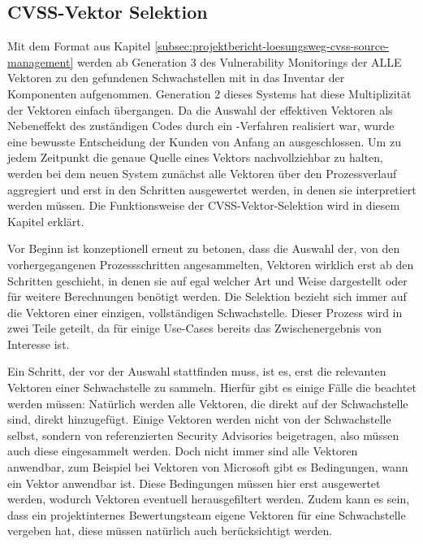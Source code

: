 \subsection{CVSS-Vektor Selektion} \label{subsec:projektbericht-loesungsweg-cvss-selection}

Mit dem Format aus Kapitel \ref{subsec:projektbericht-loesungsweg-cvss-source-management} werden ab Generation 3 des Vulnerability Monitorings der {\metaeffekt} ALLE Vektoren zu den gefundenen Schwachstellen mit in das Inventar der Komponenten aufgenommen.
Generation 2 dieses Systems hat diese Multiplizität der Vektoren einfach übergangen.
Da die Auswahl der effektiven Vektoren als Nebeneffekt des zuständigen Codes durch ein -Verfahren realisiert war, wurde eine bewusste Entscheidung der Kunden von Anfang an ausgeschlossen.
Um zu jedem Zeitpunkt die genaue Quelle eines Vektors nachvollziehbar zu halten, werden bei dem neuen System zunächst alle Vektoren über den Prozessverlauf aggregiert und erst in den Schritten ausgewertet werden, in denen sie interpretiert werden müssen.
Die Funktionsweise der CVSS-Vektor-Selektion wird in diesem Kapitel erklärt.

Vor Beginn ist konzeptionell erneut zu betonen, dass die Auswahl der, von den vorhergegangenen Prozessschritten angesammelten, Vektoren wirklich erst ab den Schritten geschieht, in denen sie auf egal welcher Art und Weise dargestellt oder für weitere Berechnungen benötigt werden.
Die Selektion bezieht sich immer auf die Vektoren einer einzigen, vollständigen Schwachstelle.
Dieser Prozess wird in zwei Teile geteilt, da für einige Use-Cases bereits das Zwischenergebnis von Interesse ist.

Ein Schritt, der vor der Auswahl stattfinden muss, ist es, erst die relevanten Vektoren einer Schwachstelle zu sammeln.
Hierfür gibt es einige Fälle die beachtet werden müssen:
Natürlich werden alle Vektoren, die direkt auf der Schwachstelle sind, direkt hinzugefügt.
Einige Vektoren werden nicht von der Schwachstelle selbst, sondern von referenzierten Security Advisories beigetragen, also müssen auch diese eingesammelt werden.
Doch nicht immer sind alle Vektoren anwendbar, zum Beispiel bei Vektoren von Microsoft gibt es Bedingungen, wann ein Vektor anwendbar ist.
Diese Bedingungen müssen hier erst ausgewertet werden, wodurch Vektoren eventuell herausgefiltert werden.
Zudem kann es sein, dass ein projektinternes Bewertungsteam eigene Vektoren für eine Schwachstelle vergeben hat, diese müssen natürlich auch berücksichtigt werden.

